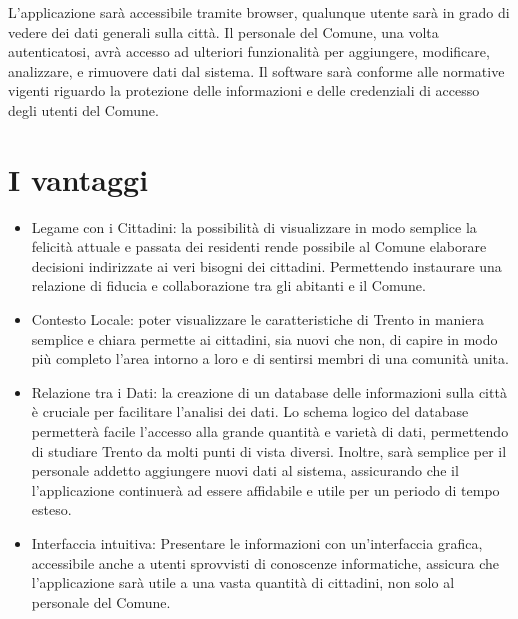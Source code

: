     L'applicazione sarà accessibile tramite browser, qualunque utente sarà in grado di vedere dei dati generali sulla città. Il personale del Comune, una volta autenticatosi, avrà accesso ad ulteriori funzionalità per aggiungere, modificare, analizzare, e rimuovere dati dal sistema. Il software sarà conforme alle normative vigenti riguardo la protezione delle informazioni e delle credenziali di accesso degli utenti del Comune.


\section{I vantaggi}
    \begin{itemize}
        \item Legame con i Cittadini: la possibilità di visualizzare in modo semplice la felicità attuale e passata dei residenti rende possibile al Comune elaborare decisioni indirizzate ai veri bisogni dei cittadini. Permettendo instaurare una relazione di fiducia e collaborazione tra gli abitanti e il Comune.
        \item Contesto Locale: poter visualizzare le caratteristiche di Trento in maniera semplice e chiara permette ai cittadini, sia nuovi che non, di capire in modo più completo l'area intorno a loro e di sentirsi membri di una comunità unita.
        \item Relazione tra i Dati: la creazione di un database delle informazioni sulla città è cruciale per facilitare l'analisi dei dati. Lo schema logico del database permetterà facile l'accesso alla grande quantità e varietà di dati, permettendo di studiare Trento da molti punti di vista diversi. Inoltre, sarà semplice per il personale addetto aggiungere nuovi dati al sistema, assicurando che il l'applicazione continuerà ad essere affidabile e utile per un periodo di tempo esteso.
        \item Interfaccia intuitiva: Presentare le informazioni con un'interfaccia grafica, accessibile anche a utenti sprovvisti di conoscenze informatiche, assicura che l'applicazione sarà utile a una vasta quantità di cittadini, non solo al personale del Comune.
    \end{itemize}